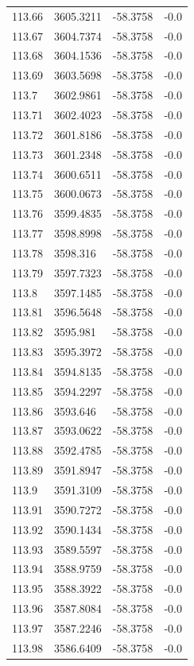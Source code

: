 \begin{table}[H]
\begin{tabular}{llll}
113.66 & 3605.3211 & -58.3758 & -0.0 \\
113.67 & 3604.7374 & -58.3758 & -0.0 \\
113.68 & 3604.1536 & -58.3758 & -0.0 \\
113.69 & 3603.5698 & -58.3758 & -0.0 \\
113.7 & 3602.9861 & -58.3758 & -0.0 \\
113.71 & 3602.4023 & -58.3758 & -0.0 \\
113.72 & 3601.8186 & -58.3758 & -0.0 \\
113.73 & 3601.2348 & -58.3758 & -0.0 \\
113.74 & 3600.6511 & -58.3758 & -0.0 \\
113.75 & 3600.0673 & -58.3758 & -0.0 \\
113.76 & 3599.4835 & -58.3758 & -0.0 \\
113.77 & 3598.8998 & -58.3758 & -0.0 \\
113.78 & 3598.316 & -58.3758 & -0.0 \\
113.79 & 3597.7323 & -58.3758 & -0.0 \\
113.8 & 3597.1485 & -58.3758 & -0.0 \\
113.81 & 3596.5648 & -58.3758 & -0.0 \\
113.82 & 3595.981 & -58.3758 & -0.0 \\
113.83 & 3595.3972 & -58.3758 & -0.0 \\
113.84 & 3594.8135 & -58.3758 & -0.0 \\
113.85 & 3594.2297 & -58.3758 & -0.0 \\
113.86 & 3593.646 & -58.3758 & -0.0 \\
113.87 & 3593.0622 & -58.3758 & -0.0 \\
113.88 & 3592.4785 & -58.3758 & -0.0 \\
113.89 & 3591.8947 & -58.3758 & -0.0 \\
113.9 & 3591.3109 & -58.3758 & -0.0 \\
113.91 & 3590.7272 & -58.3758 & -0.0 \\
113.92 & 3590.1434 & -58.3758 & -0.0 \\
113.93 & 3589.5597 & -58.3758 & -0.0 \\
113.94 & 3588.9759 & -58.3758 & -0.0 \\
113.95 & 3588.3922 & -58.3758 & -0.0 \\
113.96 & 3587.8084 & -58.3758 & -0.0 \\
113.97 & 3587.2246 & -58.3758 & -0.0 \\
113.98 & 3586.6409 & -58.3758 & -0.0 \\

\end{tabular}
\end{table}
